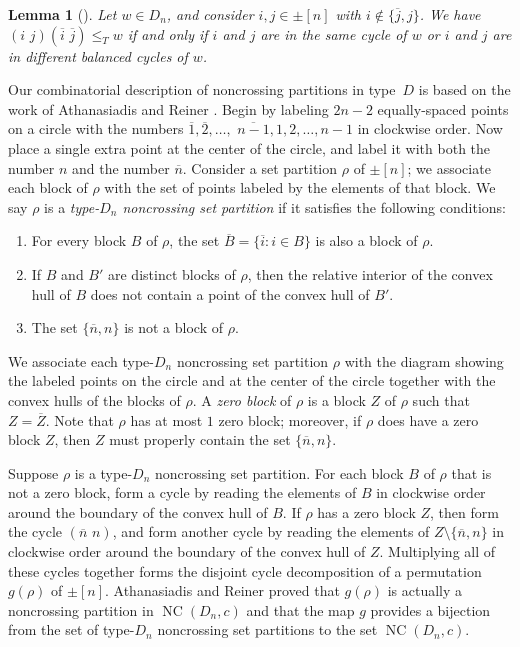 \documentclass[10pt,a4paper]{amsart}
\newtheorem{lemma}[lemma]{Lemma}
\newcommand{\darkblue}{\color{darkblue}}
\newcommand{\defn}[1]{\emph{\darkblue #1}}
\DeclareMathOperator{\NC}{NC}
\begin{document}
\begin{lemma}[\cite{BradyWatt}]\label{Lem1}
Let $w\in D_n$, and consider $i,j\in\pm[n]$ with $i\not\in\{\overline j,j\}$. We have $(i\,\,j)(\overline i\,\,\overline j)\leq_T w$ if and only if $i$ and $j$ are in the same cycle of $w$ or $i$ and $j$ are in different balanced cycles of $w$. 
\end{lemma}

Our combinatorial description of noncrossing partitions in type~$D$ is based on the work of Athanasiadis and Reiner \cite{AthanasiadisReiner}. Begin by labeling $2n{-}2$ equally-spaced points on a circle with the numbers $\overline 1,\overline 2,\ldots,$ $\overline{n-1},1,2,\ldots,n-1$ in clockwise order. Now place a single extra point at the center of the circle, and label it with both the number $n$ and the number $\overline n$. Consider a set partition $\rho$ of $\pm[n]$; we associate each block of $\rho$ with the set of points labeled by the elements of that block. We say $\rho$ is a \defn{type-$D_n$ noncrossing set partition} if it satisfies the following conditions: 


\begin{enumerate}
    \item\label{sect5_1} For every block $B$ of $\rho$, the set $\overline B=\{\overline i:i\in B\}$ is also a block of $\rho$.
    \item\label{sect5_2} If $B$ and $B'$ are distinct blocks of $\rho$, then the relative interior of the convex hull of $B$ does not contain a point of the convex hull of $B'$. 
    \item\label{sect5_3} The set $\{\overline n,n\}$ is not a block of $\rho$. 
\end{enumerate}

We associate each type-$D_n$ noncrossing set partition $\rho$ with the diagram showing the labeled points on the circle and at the center of the circle together with the convex hulls of the blocks of $\rho$. A \defn{zero block} of $\rho$ is a block $Z$ of $\rho$ such that $Z=\overline Z$. Note that $\rho$ has at most $1$ zero block; moreover, if $\rho$ does have a zero block $Z$, then $Z$ must properly contain the set $\{\overline n,n\}$. 

Suppose $\rho$ is a type-$D_n$ noncrossing set partition. For each block $B$ of $\rho$ that is not a zero block, form a cycle by reading the elements of $B$ in clockwise order around the boundary of the convex hull of $B$. If $\rho$ has a zero block $Z$, then form the cycle $(\overline n\,\, n)$, and form another cycle by reading the elements of $Z\setminus\{\overline n,n\}$ in clockwise order around the boundary of the convex hull of $Z$. Multiplying all of these cycles together forms the disjoint cycle decomposition of a permutation $g(\rho)$ of $\pm[n]$. Athanasiadis and Reiner \cite{AthanasiadisReiner} proved that $g(\rho)$ is actually a noncrossing partition in $\NC(D_n,c)$ and that the map $g$ provides a bijection from the set of type-$D_n$ noncrossing set partitions to the set $\NC(D_n,c)$. 
\end{document}
